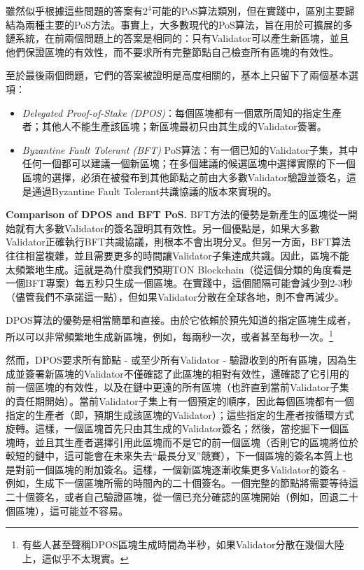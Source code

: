 \documentclass[12pt,oneside]{article}
\def\makepoint#1{\medbreak\noindent{\bf #1.\ }}
\def\nxsubpoint{\refstepcounter{subsubsection}%
  \smallbreak\makepoint{\thesubsubsection}}
\def\embt(#1.){\textbf{#1.}}
\begin{document}
雖然似乎根據這些問題的答案有$2^4$可能的PoS算法類別，但在實踐中，區別主要歸結為兩種主要的PoS方法。事實上，大多數現代的PoS算法，旨在用於可擴展的多鏈系統，在前兩個問題上的答案是相同的：只有Validator可以產生新區塊，並且他們保證區塊的有效性，而不要求所有完整節點自己檢查所有區塊的有效性。

至於最後兩個問題，它們的答案被證明是高度相關的，基本上只留下了兩個基本選項：
\begin{itemize}
\item {\em Delegated Proof-of-Stake (DPOS)}：每個區塊都有一個眾所周知的指定生產者；其他人不能生產該區塊；新區塊最初只由其生成的Validator簽署。
\item {\em Byzantine Fault Tolerant (BFT)} PoS算法：有一個已知的Validator子集，其中任何一個都可以建議一個新區塊；在多個建議的候選區塊中選擇實際的下一個區塊的選擇，必須在被發布到其他節點之前由大多數Validator驗證並簽名，這是通過Byzantine Fault Tolerant共識協議的版本來實現的。
\end{itemize}

\nxsubpoint\label{sp:dpos.bft.compare} \embt(Comparison of DPOS and
BFT PoS.) BFT方法的優勢是新產生的區塊從一開始就有大多數Validator的簽名證明其有效性。另一個優點是，如果大多數Validator正確執行BFT共識協議，則根本不會出現分叉。但另一方面，BFT算法往往相當複雜，並且需要更多的時間讓Validator子集達成共識。因此，區塊不能太頻繁地生成。這就是為什麼我們預期TON Blockchain（從這個分類的角度看是一個BFT專案）每五秒只生成一個區塊。在實踐中，這個間隔可能會減少到2-3秒（儘管我們不承諾這一點），但如果Validator分散在全球各地，則不會再減少。

DPOS算法的優勢是相當簡單和直接。由於它依賴於預先知道的指定區塊生成者，所以可以非常頻繁地生成新區塊，例如，每兩秒一次，或者甚至每秒一次。\footnote{有些人甚至聲稱DPOS區塊生成時間為半秒，如果Validator分散在幾個大陸上，這似乎不太現實。}

然而，DPOS要求所有節點 - 或至少所有Validator - 驗證收到的所有區塊，因為生成並簽署新區塊的Validator不僅確認了此區塊的相對有效性，還確認了它引用的前一個區塊的有效性，以及在鏈中更遠的所有區塊（也許直到當前Validator子集的責任期開始）。當前Validator子集上有一個預定的順序，因此每個區塊都有一個指定的生產者（即，預期生成該區塊的Validator）；這些指定的生產者按循環方式旋轉。這樣，一個區塊首先只由其生成的Validator簽名；然後，當挖掘下一個區塊時，並且其生產者選擇引用此區塊而不是它的前一個區塊（否則它的區塊將位於較短的鏈中，這可能會在未來失去“最長分叉”競賽），下一個區塊的簽名本質上也是對前一個區塊的附加簽名。這樣，一個新區塊逐漸收集更多Validator的簽名 - 例如，生成下一個區塊所需的時間內的二十個簽名。一個完整的節點將需要等待這二十個簽名，或者自己驗證區塊，從一個已充分確認的區塊開始（例如，回退二十個區塊），這可能並不容易。
\end{document}
